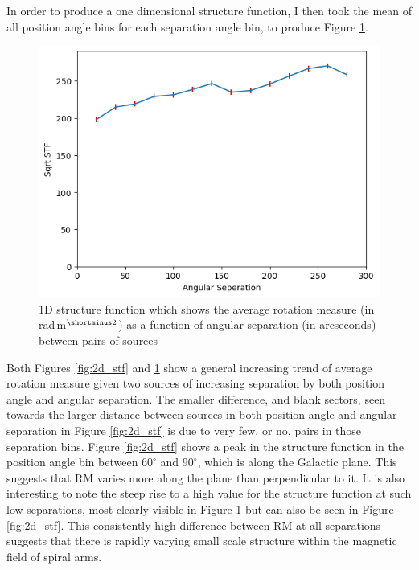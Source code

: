 In order to produce a one dimensional structure function, I then took the mean of all position angle bins for each separation angle bin, to produce Figure \ref{fig:1d_stf}.



\begin{figure}
        \centering
        \includegraphics[width=\linewidth]{Thesis_Template/Figures/1D Structure Function.png}
        \caption{1D structure function which shows the average rotation measure (in rad$\,$m$^{\shortminus2}$) as a function of angular separation (in arcseconds) between pairs of sources}
        \label{fig:1d_stf}
    \end{figure}

Both Figures \ref{fig:2d_stf} and \ref{fig:1d_stf}  show a general increasing trend of average rotation measure given two sources of increasing separation by both position angle and angular separation. The smaller difference, and blank sectors, seen towards the larger distance between sources in both position angle and angular separation in Figure \ref{fig:2d_stf} is due to very few, or no, pairs in those separation bins. Figure \ref{fig:2d_stf} shows a peak in the structure function in the position angle bin between $60^\circ$ and $90^\circ$, which is along the Galactic plane. This suggests that RM varies more along the plane than perpendicular to it. It is also interesting to note the steep rise to a high value for the structure function at such low separations, most clearly visible in Figure \ref{fig:1d_stf} but can also be seen in Figure \ref{fig:2d_stf}. This consistently high difference between RM at all separations suggests that there is rapidly varying small scale structure within the magnetic field of spiral arms. 


